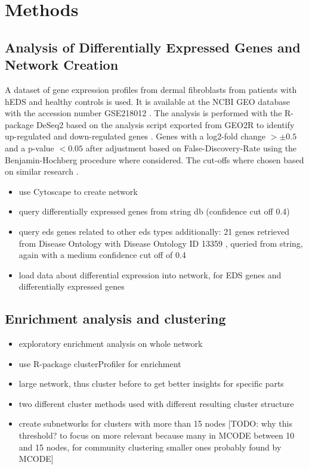 \section{Methods}

\subsection{Analysis of Differentially Expressed Genes and Network Creation}\label{sec:methods-deg}
A dataset of gene expression profiles from dermal fibroblasts from patients with hEDS and healthy controls is used. It is available at the NCBI GEO database with the accession number GSE218012 \cite{Ritelli2020}. The analysis is performed with the R-package DeSeq2 based on the analysis script exported from GEO2R to identify up-regulated and down-regulated genes \cite{DESeq2}. Genes with a log2-fold change $> \pm 0.5$ and a p-value $< 0.05$ after adjustment based on False-Discovery-Rate using the Benjamin-Hochberg procedure where considered. The cut-offs where chosen based on similar research \cite{Karimizadeh2019, Lim2019}.

\begin{itemize}
	\item use Cytoscape to create network \cite{Cytoscape}
	\item query differentially expressed genes from string db \cite{StringDB} (confidence cut off 0.4)
	\item query eds genes related to other eds types additionally: 21 genes retrieved from Disease Ontology with Disease Ontology ID 13359 \cite{DO}, queried from string, again with a medium confidence cut off of 0.4
	\item load data about differential expression into network, for EDS genes and differentially expressed genes
\end{itemize}

\subsection{Enrichment analysis and clustering}
\begin{itemize}
	\item exploratory enrichment analysis on whole network
	\item use R-package clusterProfiler \cite{Wu2021} for enrichment
	\item large network, thus cluster before to get better insights for specific parts
	\item two different cluster methods used with different resulting cluster structure
	\item create subnetworks for clusters with more than 15 nodes [TODO: why this threshold? to focus on more relevant because many in MCODE between 10 and 15 nodes, for community clustering smaller ones probably found by MCODE]
\end{itemize}
